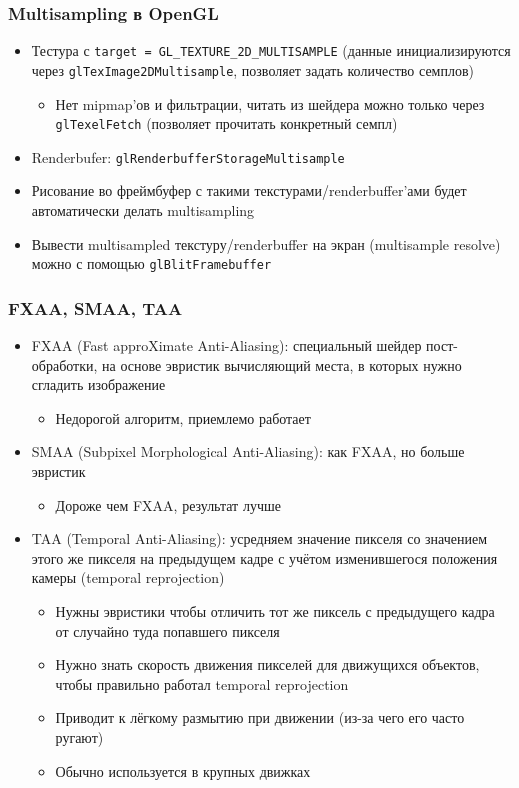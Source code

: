 \documentclass{beamer}
\begin{document}
\begin{frame}[fragile]
\frametitle{Multisampling в OpenGL}
\begin{itemize}
\item Тестура с \verb|target = GL_TEXTURE_2D_MULTISAMPLE| (данные инициализируются через \verb|glTexImage2DMultisample|, позволяет задать количество семплов)
\begin{itemize}
\item Нет mipmap'ов и фильтрации, читать из шейдера можно только через \verb|glTexelFetch| (позволяет прочитать конкретный семпл)
\end{itemize}
\pause
\item Renderbufer: \verb|glRenderbufferStorageMultisample|
\pause
\item Рисование во фреймбуфер с такими текстурами/renderbuffer'ами будет автоматически делать multisampling
\pause
\item Вывести multisampled текстуру/renderbuffer на экран (multisample resolve) можно с помощью \verb|glBlitFramebuffer|
\end{itemize}
\end{frame}

\begin{frame}[fragile]
\frametitle{FXAA, SMAA, TAA}
\begin{itemize}
\item FXAA (Fast approXimate Anti-Aliasing): специальный шейдер пост-обработки, на основе эвристик вычисляющий места, в которых нужно сгладить изображение
\begin{itemize}
\item Недорогой алгоритм, приемлемо работает
\end{itemize}
\pause
\item SMAA (Subpixel Morphological Anti-Aliasing): как FXAA, но больше эвристик
\begin{itemize}
\item Дороже чем FXAA, результат лучше
\end{itemize}
\pause
\item TAA (Temporal Anti-Aliasing): усредняем значение пикселя со значением этого же пикселя на предыдущем кадре с учётом изменившегося положения камеры (temporal reprojection)
\begin{itemize}
\item Нужны эвристики чтобы отличить тот же пиксель с предыдущего кадра от случайно туда попавшего пикселя
\item Нужно знать скорость движения пикселей для движущихся объектов, чтобы правильно работал temporal reprojection
\item Приводит к лёгкому размытию при движении (из-за чего его часто ругают)
\item Обычно используется в крупных движках
\end{itemize}
\end{itemize}
\end{frame}
\end{document}
